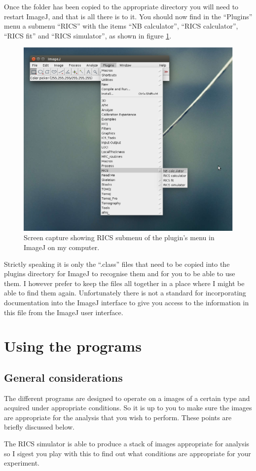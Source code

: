 \documentclass[10pt]{article}
\begin{document}
Once the folder has been copied to the appropriate directory you will need to 
restart ImageJ, and that is all there is to it. 
You should now find in the ``Plugins'' menu a submenu ``RICS'' with
the items ``NB calculator'', ``RICS calculator'', ``RICS fit'' and ``RICS simulator'',
as shown in figure \ref{fig:MenuFig}.

\begin{figure}
\centerline{\includegraphics[width=.50\textwidth]{Images/MenuFig.eps}}
\caption{Screen capture showing RICS submenu of the plugin's menu in ImageJ on my computer.}
\label{fig:MenuFig}
\end{figure}

Strictly speaking it is only the ``.class'' files that need to be copied into the
plugins directory for ImageJ to recognise them and for you to be able to use them.
I however prefer to keep the files all together in a place where I might be able 
to find them again.
Unfortunately there is not a standard for incorporating documentation into the ImageJ
interface to give you access to the information in this file from the ImageJ 
user interface.

\section{Using the programs}

\subsection{General considerations}

The different programs are designed to operate on a images of a certain type and
acquired under appropriate conditions. So it is up to you to make sure the
images are appropriate for the analysis that you wish to perform. These points
are briefly discussed below. 

The RICS simulator is able to produce a stack of images appropriate for analysis
so I sigest you play with this to find out what conditions are appropriate for
your experiment. 
\end{document}
